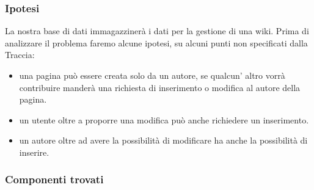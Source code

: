 \subsubsection{Ipotesi}
La nostra base di dati immagazzinerà i dati per la gestione di una wiki. Prima di analizzare il problema faremo alcune ipotesi, su alcuni punti non specificati dalla Traccia:
    \begin{itemize}

        \item{
            una pagina può essere creata solo da un autore, se qualcun' altro vorrà contribuire manderà una richiesta di inserimento o modifica al autore della pagina.
        }
        \item{
            un utente oltre a proporre una modifica può anche richiedere un inserimento. 
        }

        \item{
            un autore oltre ad avere la possibilità di modificare ha anche la possibilità di inserire.
        }

    \end{itemize}


\subsubsection{Componenti trovati}

